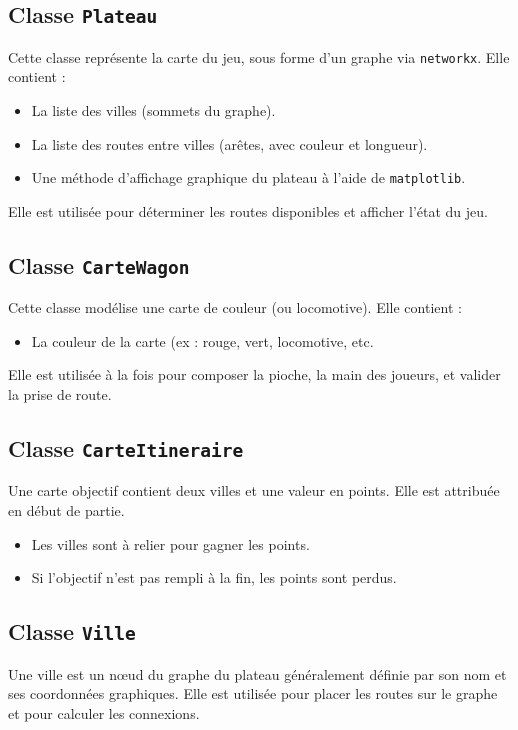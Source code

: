 \documentclass[a4paper,12pt]{report}
\begin{document}
\subsection*{Classe \texttt{Plateau}}

Cette classe représente la carte du jeu, sous forme d’un graphe via \texttt{networkx}. Elle contient :
\begin{itemize}
    \item La liste des villes (sommets du graphe).
    \item La liste des routes entre villes (arêtes, avec couleur et longueur).
    \item Une méthode d'affichage graphique du plateau à l’aide de \texttt{matplotlib}.
\end{itemize}
Elle est utilisée pour déterminer les routes disponibles et afficher l’état du jeu.

\subsection*{Classe \texttt{CarteWagon}}

Cette classe modélise une carte de couleur (ou locomotive). Elle contient :
\begin{itemize}
    \item La couleur de la carte (ex : rouge, vert, locomotive, etc.
\end{itemize}
Elle est utilisée à la fois pour composer la pioche, la main des joueurs, et valider la prise de route.

\subsection*{Classe \texttt{CarteItineraire}}

Une carte objectif contient deux villes et une valeur en points. Elle est attribuée en début de partie.
\begin{itemize}
    \item Les villes sont à relier pour gagner les points.
    \item Si l’objectif n’est pas rempli à la fin, les points sont perdus.
\end{itemize}

\subsection*{Classe \texttt{Ville}}

Une ville est un nœud du graphe du plateau généralement définie par son nom et ses coordonnées graphiques.
Elle est utilisée pour placer les routes sur le graphe et pour calculer les connexions.
\end{document}
